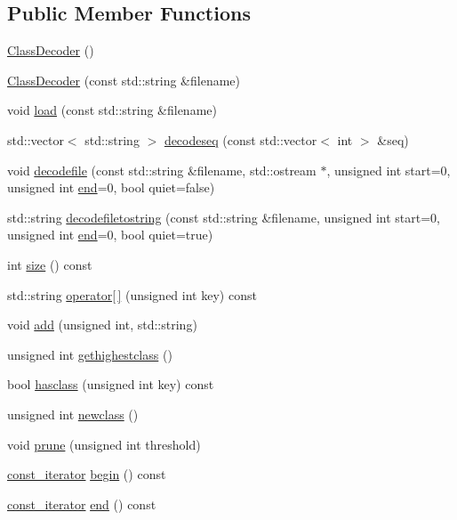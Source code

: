 \subsection*{Public Member Functions}
\begin{DoxyCompactItemize}
\item 
\hyperlink{classClassDecoder_a1964931b3b4f83220f0468e9a5a3f5ab}{Class\+Decoder} ()
\item 
\hyperlink{classClassDecoder_ae68c4f3ffc8bc69d67750828876484ce}{Class\+Decoder} (const std\+::string \&filename)
\item 
void \hyperlink{classClassDecoder_a497f71de32cb7cfafbb67657afc6a2be}{load} (const std\+::string \&filename)
\item 
std\+::vector$<$ std\+::string $>$ \hyperlink{classClassDecoder_ac7b469a8815a77b07daee3e76ef41f8f}{decodeseq} (const std\+::vector$<$ int $>$ \&seq)
\item 
void \hyperlink{classClassDecoder_a6e9e821e67a97d9197047d64a5e1cb18}{decodefile} (const std\+::string \&filename, std\+::ostream $\ast$, unsigned int start=0, unsigned int \hyperlink{classClassDecoder_af3c11f55c5acdc9e0e6f7ec4ec0a45e7}{end}=0, bool quiet=false)
\item 
std\+::string \hyperlink{classClassDecoder_a75348f84c3f9eb4f699f1b0986593ea6}{decodefiletostring} (const std\+::string \&filename, unsigned int start=0, unsigned int \hyperlink{classClassDecoder_af3c11f55c5acdc9e0e6f7ec4ec0a45e7}{end}=0, bool quiet=true)
\item 
int \hyperlink{classClassDecoder_af4a58ebdaed62bbc27f3d0fd860c9dde}{size} () const 
\item 
std\+::string \hyperlink{classClassDecoder_ab212c7a5643348965fc70e85ccf6a454}{operator\mbox{[}$\,$\mbox{]}} (unsigned int key) const 
\item 
void \hyperlink{classClassDecoder_a92ceaca2cdad3cdd40cf4489dffb70be}{add} (unsigned int, std\+::string)
\item 
unsigned int \hyperlink{classClassDecoder_a90399b17e31b20a7330fcdd501e8350a}{gethighestclass} ()
\item 
bool \hyperlink{classClassDecoder_ade08d075b70964c24a2fba6b5f43f7da}{hasclass} (unsigned int key) const 
\item 
unsigned int \hyperlink{classClassDecoder_ab8418982b22ee11e48d89175bcf5e66d}{newclass} ()
\item 
void \hyperlink{classClassDecoder_aaddeef1f5e8730eb6eeb5351db4eb826}{prune} (unsigned int threshold)
\item 
\hyperlink{classClassDecoder_a24770930683eb9829a898343fe016929}{const\+\_\+iterator} \hyperlink{classClassDecoder_ab52e0396600b9fca95348c603b6aca7d}{begin} () const 
\item 
\hyperlink{classClassDecoder_a24770930683eb9829a898343fe016929}{const\+\_\+iterator} \hyperlink{classClassDecoder_af3c11f55c5acdc9e0e6f7ec4ec0a45e7}{end} () const 
\end{DoxyCompactItemize}


